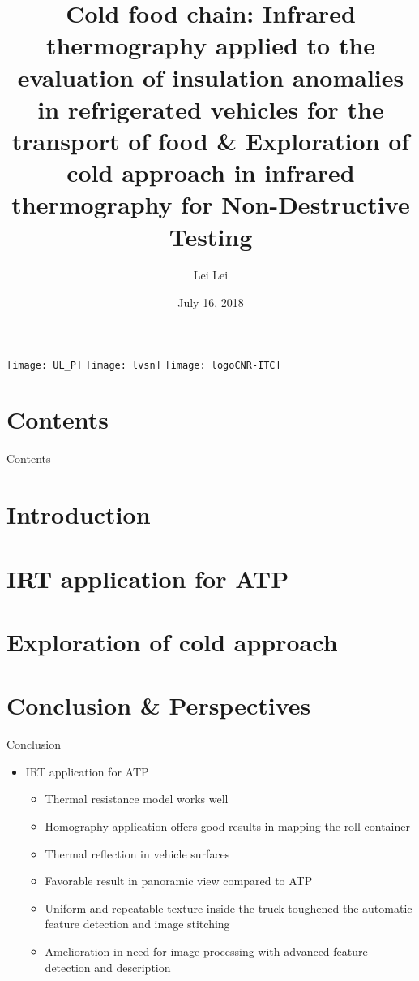 \documentclass{beamer}
\title[Cold food chain-IRT application]{Cold food chain: Infrared thermography applied to the evaluation of insulation anomalies in refrigerated vehicles for the transport of food \& Exploration of cold approach in infrared thermography for Non-Destructive Testing}
\author[Lei Lei]{Lei Lei}
\institute[Université Laval]
{
	Electrical and Computer Engineering Department \\
	Laval University, Quebec City, Canada \\
	\medskip
}
\date{July 16, 2018} %
\begin{document}
\begin{frame}[label=titre, plain]
	\titlepage
	\begin{center}
		\texttt{[image: UL\_P]}%
		\hspace{1cm}
		\texttt{[image: lvsn]}
		\hspace{1cm}
		\texttt{[image: logoCNR-ITC]}
	\end{center}
\end{frame}


\section*{Contents}

\begin{frame}[label=toc]{Contents}
	\setlength{\leftskip}{5cm}%
	\tableofcontents[subsubsectionstyle=hide]
\end{frame}


\section{Introduction}


\section{IRT application for ATP}




\section{Exploration of cold approach}




\section{Conclusion \& Perspectives}

\begin{frame}{Conclusion}
    \begin{itemize}%
        \item IRT application for ATP
        \begin{itemize}
	        \item Thermal resistance model works well
	        \item Homography application offers good results in mapping the roll-container
	        \item Thermal reflection in vehicle surfaces
	        \pause
	        \bigskip
	        \item Favorable result in panoramic view compared to ATP
	        \item Uniform and repeatable texture inside the truck toughened the automatic feature detection and image stitching
	        \item Amelioration in need for image processing with advanced feature detection and description	        
        \end{itemize}
    \end{itemize}
\end{frame}
\end{document}
